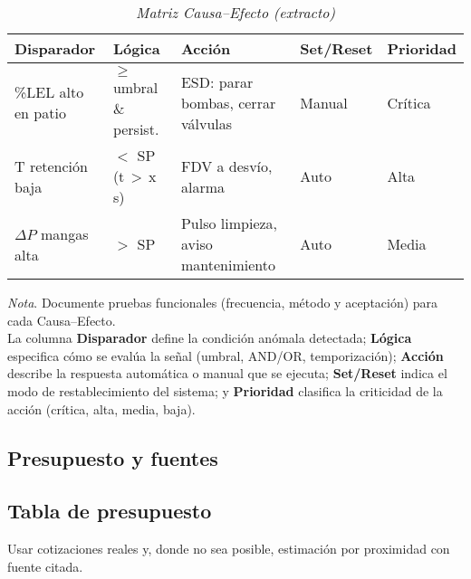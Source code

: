 \documentclass[12pt,letterpaper]{report}
\begin{document}
	\begin{table}[ht]
		\captionsetup{justification=raggedright,singlelinecheck=false}
		\caption{\textit{Matriz Causa--Efecto (extracto)}}
		\label{tab:causa_efecto}
		\centering
		\begin{tabular}{lllll}
			\toprule
			\textbf{Disparador} & \textbf{Lógica} & \textbf{Acción} & \textbf{Set/Reset} & \textbf{Prioridad} \\
			\midrule
			\%LEL alto en patio & $\geq$ umbral \& persist. & ESD: parar bombas, cerrar válvulas & Manual & Crítica \\
			T retención baja & $<$ SP (t\,$>$\,x s) & FDV a desvío, alarma & Auto & Alta \\
			$\Delta P$ mangas alta & $>$ SP & Pulso limpieza, aviso mantenimiento & Auto & Media \\
			\bottomrule
		\end{tabular}
		\begin{flushleft}
			\textit{Nota}. Documente pruebas funcionales (frecuencia, método y aceptación) para cada Causa--Efecto. \\
			La columna \textbf{Disparador} define la condición anómala detectada; 
			\textbf{Lógica} especifica cómo se evalúa la señal (umbral, AND/OR, temporización); 
			\textbf{Acción} describe la respuesta automática o manual que se ejecuta; 
			\textbf{Set/Reset} indica el modo de restablecimiento del sistema; 
			y \textbf{Prioridad} clasifica la criticidad de la acción (crítica, alta, media, baja).
		\end{flushleft}
	\end{table}
	
	\newpage
	\begin{center}
		\section{Presupuesto y fuentes}
	\end{center}
		
	\subsection{Tabla de presupuesto}
	Usar cotizaciones reales y, donde no sea posible, estimación por proximidad con fuente citada.
	
\end{document}
